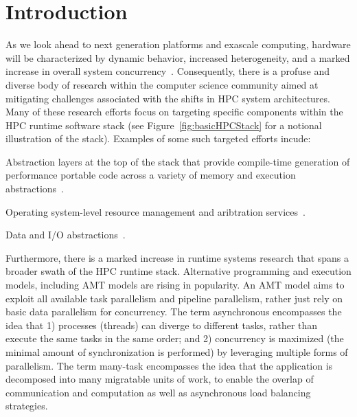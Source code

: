 

\chapter{Introduction}
\label{chap:introduction}
As we look ahead to next generation platforms and exascale computing,  hardware 
will be characterized by dynamic behavior, increased
heterogeneity, and a marked increase in overall system \gls{concurrency}~\cite{doe_arch, dav_exascale}. 
Consequently, there is a profuse and diverse body of research within the
computer science community aimed at mitigating challenges associated with
the shifts in \gls{HPC} system architectures.  Many of these research efforts focus on targeting
specific components within the \gls{HPC} runtime software stack (see
Figure~\ref{fig:basicHPCStack} for a notional illustration of the stack).
Examples of some such targeted efforts incude:
\begin{compactenum}
\item Abstraction layers at the top of the stack that provide compile-time generation 
of performance portable code across a variety of memory and execution
abstractions~\cite{Kokkos, RAJA}. 
\item Operating system-level resource management and aribtration services~\cite{Qthreads, Hobbs, Kitten}. 
\item Data and I/O abstractions~\cite{Kelpie, Nessie, Adios, DataSpaces, LLNLandLANLDW}.  
\end{compactenum}

Furthermore, there is a marked increase in runtime systems
research that spans a broader swath of the \gls{HPC} runtime stack.  
Alternative programming  and \glspl{execution model}, including \gls{AMT}
models are rising in popularity.  
An \gls{AMT} model aims to exploit all available \gls{task parallelism} and
\gls{pipeline parallelism}, rather just rely on basic \gls{data parallelism}
for \gls{concurrency}. The term asynchronous encompasses the idea that 
1) processes (threads) can diverge to different tasks, rather than execute 
the same tasks in the same order; and 2) concurrency is maximized (the 
  minimal amount of synchronization is performed) by 
leveraging multiple forms of parallelism. The term many-task encompasses 
the idea that the application is decomposed into many 
\gls{migratable} units of work, to enable the overlap of communication and 
computation as well as asynchronous load balancing strategies.

